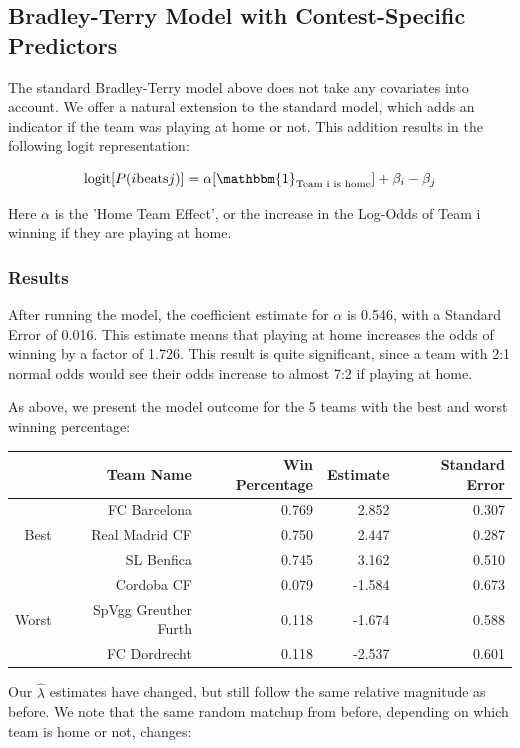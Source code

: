 \documentclass{article}
\begin{document}
\subsection{Bradley-Terry Model with Contest-Specific Predictors}

The standard Bradley-Terry model above does not take any covariates into account. We offer a natural extension to the standard model, which adds an indicator if the team was playing at home or not. This addition results in the following logit representation:

$$\text{logit}[P(i \text{beats} j)] = \alpha[\mathbbm{1}_{\text{Team i is home}}] + \beta_i - \beta_j$$

Here $\alpha$ is the 'Home Team Effect', or the increase in the Log-Odds of Team i winning if they are playing at home.

\subsubsection{Results}

After running the model, the coefficient estimate for $\alpha$ is 0.546, with a Standard Error of 0.016. This estimate means that playing at home increases the odds of winning by a factor of 1.726. This result is quite significant, since a team with 2:1 normal odds would see their odds increase to almost 7:2 if playing at home.

As above, we present the model outcome for the 5 teams with the best and worst winning percentage:

\begin{table}[H]
\centering
\begin{tabular}{|r|rrrr|}
  \hline
 & Team Name & Win Percentage & Estimate & Standard Error \\ 
  \hline
   &  FC Barcelona & 0.769 & 2.852 & 0.307 \\ 
 Best  &  Real Madrid CF & 0.750 & 2.447 & 0.287 \\ 
   &  SL Benfica & 0.745 & 3.162 & 0.510 \\ \cline{1-5}
   &  Cordoba CF & 0.079 & -1.584 & 0.673 \\ 
Worst   &  SpVgg Greuther Furth & 0.118 & -1.674  & 0.588 \\ 
   & FC Dordrecht & 0.118 & -2.537 & 0.601 \\
   \hline
\end{tabular}
\end{table}

Our $\hat{\lambda}$ estimates have changed, but still follow the same relative magnitude as before. We note that the same random matchup from before, depending on which team is home or not, changes:
\end{document}
